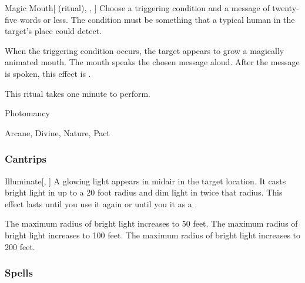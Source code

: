 \lowercase{\hypertarget{spell:Magic Mouth}{}}\label{spell:Magic Mouth}
\begin{attuneability}[Rank 1]{\hypertarget{spell:Magic Mouth}{Magic Mouth}}[ (ritual), , ]
Choose a triggering condition and a message of twenty-five words or less.
The condition must be something that a typical human in the target's place could detect.

When the triggering condition occurs, the target appears to grow a magically animated mouth.
The mouth speaks the chosen message aloud.
After the message is spoken, this effect is .

This ritual takes one minute to perform.
\end{attuneability}
\vspace{0.25em}


\newpage
\begin{spellsection}{Photomancy}

\begin{spellheader}
\end{spellheader}


 Arcane, Divine, Nature, Pact

\subsubsection{Cantrips}


\begin{freeability}{Illuminate}[, ]
A glowing light appears in midair in the target location.
It casts bright light in up to a 20 foot radius and dim light in twice that radius.
This effect lasts until you use it again or until you  it as a .

\rankline
{} The maximum radius of bright light increases to 50 feet.
 The maximum radius of bright light increases to 100 feet.
 The maximum radius of bright light increases to 200 feet.
\end{freeability}

\end{spellsection}


\subsubsection{Spells}


